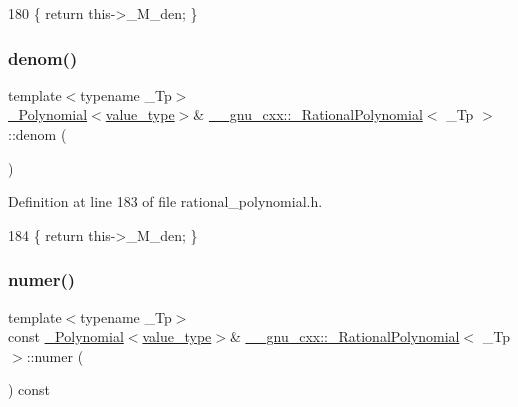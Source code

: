 \begin{DoxyCode}
180       \{ \textcolor{keywordflow}{return} this->\_M\_den; \}
\end{DoxyCode}
\mbox{\label{class____gnu__cxx_1_1__RationalPolynomial_a81fdcf1099981053c3d08ebcf8e2d278}} 
\subsubsection{\texorpdfstring{denom()}{denom()}\hspace{0.1cm}{\footnotesize\ttfamily [2/2]}}
{\footnotesize\ttfamily template$<$typename \+\_\+\+Tp$>$ \\
\hyperlink{class____gnu__cxx_1_1__Polynomial}{\+\_\+\+Polynomial}$<$\hyperlink{class____gnu__cxx_1_1__RationalPolynomial_adeec7f1bec03111031599f337848ee8b}{value\+\_\+type}$>$\& \hyperlink{class____gnu__cxx_1_1__RationalPolynomial}{\+\_\+\+\_\+gnu\+\_\+cxx\+::\+\_\+\+Rational\+Polynomial}$<$ \+\_\+\+Tp $>$\+::denom (\begin{DoxyParamCaption}{ }\end{DoxyParamCaption})\hspace{0.3cm}{\ttfamily [inline]}}



Definition at line 183 of file rational\+\_\+polynomial.\+h.


\begin{DoxyCode}
184       \{ \textcolor{keywordflow}{return} this->\_M\_den; \}
\end{DoxyCode}
\mbox{\label{class____gnu__cxx_1_1__RationalPolynomial_aa42ac2f6c2368cae05ba3a3cebf0fa24}} 
\subsubsection{\texorpdfstring{numer()}{numer()}\hspace{0.1cm}{\footnotesize\ttfamily [1/2]}}
{\footnotesize\ttfamily template$<$typename \+\_\+\+Tp$>$ \\
const \hyperlink{class____gnu__cxx_1_1__Polynomial}{\+\_\+\+Polynomial}$<$\hyperlink{class____gnu__cxx_1_1__RationalPolynomial_adeec7f1bec03111031599f337848ee8b}{value\+\_\+type}$>$\& \hyperlink{class____gnu__cxx_1_1__RationalPolynomial}{\+\_\+\+\_\+gnu\+\_\+cxx\+::\+\_\+\+Rational\+Polynomial}$<$ \+\_\+\+Tp $>$\+::numer (\begin{DoxyParamCaption}{ }\end{DoxyParamCaption}) const\hspace{0.3cm}{\ttfamily [inline]}}



